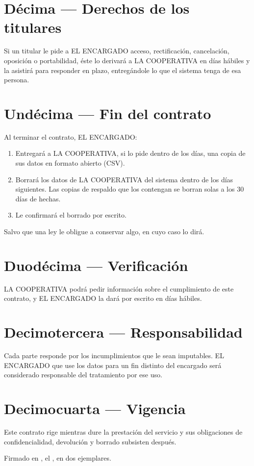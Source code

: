 \documentclass[10.5pt,a4paper]{article}
\begin{document}

\section{Décima — Derechos de los titulares}
Si un titular le pide a EL ENCARGADO acceso, rectificación, cancelación,
oposición o portabilidad, éste lo derivará a LA COOPERATIVA en 
días hábiles y la asistirá para responder en plazo, entregándole lo que el
sistema tenga de esa persona.

\section{Undécima — Fin del contrato}
Al terminar el contrato, EL ENCARGADO:
\begin{enumerate}[leftmargin=18pt]
\item Entregará a LA COOPERATIVA, si lo pide dentro de los  días,
  una copia de sus datos en formato abierto (CSV).
\item Borrará los datos de LA COOPERATIVA del sistema dentro de los
   días siguientes. Las copias de respaldo que los contengan se
  borran solas a los 30 días de hechas.
\item Le confirmará el borrado por escrito.
\end{enumerate}
Salvo que una ley le obligue a conservar algo, en cuyo caso lo dirá.

\section{Duodécima — Verificación}
LA COOPERATIVA podrá pedir información sobre el cumplimiento de este contrato,
y EL ENCARGADO la dará por escrito en  días hábiles.

\section{Decimotercera — Responsabilidad}
Cada parte responde por los incumplimientos que le sean imputables. EL
ENCARGADO que use los datos para un fin distinto del encargado será
considerado responsable del tratamiento por ese uso.

\section{Decimocuarta — Vigencia}
Este contrato rige mientras dure la prestación del servicio y sus
obligaciones de confidencialidad, devolución y borrado subsisten después.

\vspace{6pt}
Firmado en \llenar[4cm], el \llenar[4cm], en dos ejemplares.

\begin{samepage}
\noindent{}\hfill{}
\end{samepage}
\end{document}
